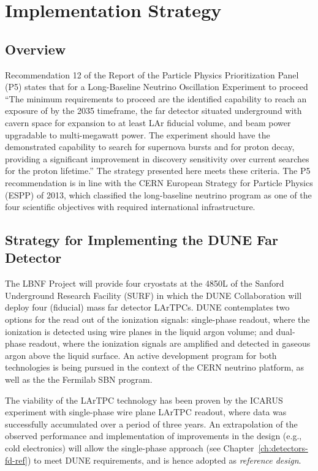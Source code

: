 
\chapter{Implementation Strategy}
\label{ch:detectors-strategy}

\section{Overview}

Recommendation 12 of the Report of the Particle Physics Prioritization
Panel (P5) states that for a Long-Baseline Neutrino Oscillation
Experiment to proceed ``The minimum requirements to proceed are the
identified capability to reach an exposure of
 by the 2035 timeframe, the far detector
situated underground with cavern space for expansion to at least 
LAr fiducial volume, and  beam power upgradable to
multi-megawatt power. The experiment should have the demonstrated
capability to search for supernova bursts and for proton decay,
providing a significant improvement in discovery sensitivity over
current searches for the proton lifetime.''  The strategy presented
here meets these criteria.  The P5 recommendation is in line with the CERN
European Strategy for Particle Physics (ESPP) of 2013, which
classified the long-baseline neutrino program as one of the four
scientific objectives with required international infrastructure.

\section{Strategy for Implementing the DUNE Far Detector}
\label{sec:detectors-strategy-FD}
The LBNF Project will provide four cryostats at the 4850L of the Sanford
Underground Research Facility (SURF) in which the DUNE Collaboration
will deploy four  (fiducial) mass far detector LArTPCs. 
DUNE contemplates two options for the
read out of the ionization signals: single-phase readout, where the
ionization is detected using wire planes in the liquid argon volume;
and dual-phase readout, where the ionization signals are amplified and
detected in gaseous argon above the liquid surface.  An active
development program for both technologies is being pursued in the
context of the CERN neutrino platform, as well as the
the Fermilab SBN program.

The viability of the LArTPC technology has been proven by the ICARUS
experiment with single-phase wire plane LArTPC readout, where data was
successfully accumulated over a period of three years.  An
extrapolation of the observed performance and implementation of
improvements in the design (e.g., cold electronics) will allow the
single-phase approach (see
Chapter~\ref{ch:detectors-fd-ref}) to meet DUNE requirements, and
is hence adopted as \textit{reference design}. 

